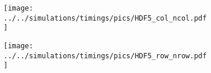 \documentclass{article}
\begin{document}
\begin{figure}[bt]
    \begin{subfigure}[b]{0.49\textwidth}
        \texttt{[image: ../../simulations/timings/pics/HDF5\_col\_ncol.pdf]}
        \caption{}
    \end{subfigure}
    \begin{subfigure}[b]{0.49\textwidth}
        \texttt{[image: ../../simulations/timings/pics/HDF5\_row\_nrow.pdf]}
        \caption{}
    \end{subfigure}
\end{figure}
\end{document}
